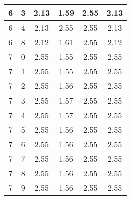 \begin{longtable}{|c|c||c||c|c||c|}
	6 & 3 & 2.13 & 1.59 & 2.55 & 2.13 \\ \hline
	6 & 4 & 2.13 & 2.55 & 2.55 & 2.13 \\ \hline
	6 & 8 & 2.12 & 1.61 & 2.55 & 2.12 \\ \hline
	7 & 0 & 2.55 & 1.55 & 2.55 & 2.55 \\ \hline
	7 & 1 & 2.55 & 1.55 & 2.55 & 2.55 \\ \hline
	7 & 2 & 2.55 & 1.56 & 2.55 & 2.55 \\ \hline
	7 & 3 & 2.55 & 1.57 & 2.55 & 2.55 \\ \hline
	7 & 4 & 2.55 & 1.57 & 2.55 & 2.55 \\ \hline
	7 & 5 & 2.55 & 1.56 & 2.55 & 2.55 \\ \hline
	7 & 6 & 2.55 & 1.56 & 2.55 & 2.55 \\ \hline
	7 & 7 & 2.55 & 1.56 & 2.55 & 2.55 \\ \hline
	7 & 8 & 2.55 & 1.56 & 2.55 & 2.55 \\ \hline
	7 & 9 & 2.55 & 1.56 & 2.55 & 2.55 \\ \hline
\end{longtable}
\clearpage{}
